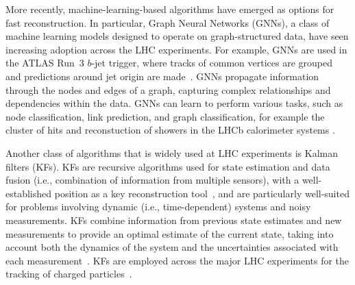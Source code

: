 


More recently, machine-learning-based algorithms have emerged as options for fast reconstruction. In particular, Graph Neural Networks (GNNs), a class of machine learning models designed to operate on graph-structured data, have seen increasing adoption across the LHC experiments. For example, GNNs are used in the ATLAS Run~3 $b$-jet trigger, where tracks of common vertices are grouped and predictions around jet origin are made~\cite{ATLASTriggerRun3}. GNNs propagate information through the nodes and edges of a graph, capturing complex relationships and dependencies within the data. GNNs can learn to perform various tasks, such as node classification, link prediction, and graph classification, for example the cluster of hits and reconstuction of showers in the LHCb calorimeter systems \cite{canudas2022graph}.

Another class of algorithms that is widely used at LHC experiments is Kalman filters (KFs). KFs are recursive algorithms used for state estimation and data fusion (i.e., combination of information from multiple sensors), with a well-established position as a key reconstruction tool~\cite{kalman-track}, and are particularly well-suited for problems involving dynamic (i.e.,  time-dependent) systems and noisy measurements. KFs combine information from previous state estimates and new measurements to provide an optimal estimate of the current state, taking into account both the dynamics of the system and the uncertainties associated with each measurement~\cite{FRUHWIRTH1987444}. KFs are employed across the major LHC experiments for the tracking of charged particles~\cite{Belikov:2003yr,ATLAS:tracking,CMS:tracking,LHCb_Allen_GPU}.